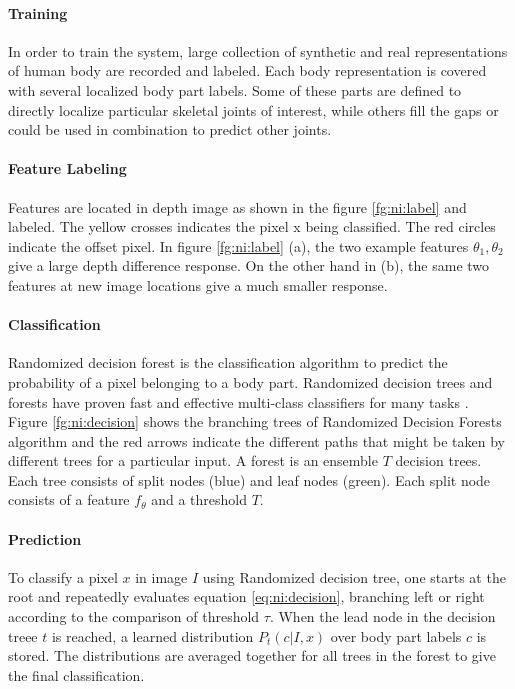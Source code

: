 

\paragraph*{Training} In order to train the system, large collection of synthetic and real representations of human body are recorded and labeled. Each body representation is covered with several localized body part labels. Some of these parts are defined to directly localize particular skeletal joints of interest, while others fill the gaps or could be used in combination to predict other joints.

%

\paragraph*{Feature Labeling} Features are located in depth image as shown in the figure \ref{fg:ni:label} and labeled. The yellow crosses indicates the pixel x being classified. The red circles indicate the offset pixel. In figure \ref{fg:ni:label} (a), the two example features $\theta_1, \theta_2$ give a large depth difference response. On the other hand in (b), the same two features at new image locations give a much smaller response.



\paragraph*{Classification} Randomized decision forest is the classification algorithm to predict the probability of a pixel belonging to a body part. Randomized decision trees and forests have proven fast and effective multi-class classifiers for many tasks \cite{13}. Figure \ref{fg:ni:decision} shows the branching trees of Randomized Decision Forests algorithm and the red arrows indicate the different paths that might be taken by different trees for a particular input. A forest is an ensemble $T$ decision trees. Each tree consists of split nodes (blue) and leaf nodes (green). Each split node consists of a feature $f_\theta$ and a threshold $T$. 



\paragraph*{Prediction} To classify a pixel $x$ in image $I$ using Randomized decision tree, one starts at the root and repeatedly evaluates equation \ref{eq:ni:decision}, branching left or right according to the comparison of threshold {$ \tau$}. When the lead node in the decision treee $t$ is reached, a learned distribution $ P_t(c|I,x) $ over body part labels $c$ is stored. The distributions are averaged together for all trees in the forest to give the final classification.

